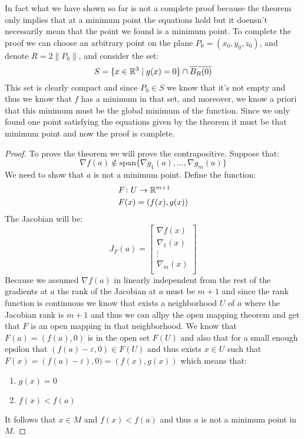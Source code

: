 \documentclass[11pt,a4paper]{article}
\begin{document}
\newpage

In fact what we have shown so far is not a complete proof because
the theorem only implies that at a minimum point the equations hold
but it doensn't necessarily mean that the point we found is a minimum
point. To complete the proof we can choose an arbitrary point on the
plane $P_0 = (x_0,y_0,z_0)$, and denote $R = 2\|P_0\|$, and consider
the set:
\[
  S = \{x \in \mathbb{R}^3 \mid g(x) = 0\} \cap \overline{B_R(0)}
\]
This set is clearly compact and since $P_0 \in S$ we know that it's not 
empty and thus we know that $f$ has a minimum in that set, and moreover,
we know a priori that this minimum must be the global minimum of the
function. Since we only found one point satisfying the equations given
by the theorem it must be that minimum point and now the proof is 
complete.

\begin{proof}
  To prove the theorem we will prove the contrapositive. Suppose that:
  \[
    \nabla f(a) \notin 
    \mathrm{span}\{\nabla g_1(a),\dots,\nabla g_m(a)\}
  \]
  We need to show that $a$ is not a minimum point. Define the function:
  \begin{align*}
    &F \colon U \to \mathbb{R}^{m+1} \\
    &F(x) = (f(x),g(x))
  \end{align*}
  The Jacobian will be:
  \[
  J_F(a) = 
    \begin{bmatrix}
      \nabla f(x)\\
      \nabla_1(x)\\
      \vdots\\
      \nabla_m(x)\\
    \end{bmatrix}
  \]
  Because we assumed $\nabla f(a)$ in linearly independent from the
  rest of the gradients at $a$ the rank of the Jacobian at $a$ must
  be $m + 1$ and since the rank function is continuous we know that
  exists a neighborhood $U$ of $a$ where the Jacobian rank is $m + 1$
  and thus we can allpy the open mapping theorem and get that $F$
  is an open mapping in that neighborhood. We know that 
  $F(a) = (f(a), 0)$ is in the open set $F(U)$ and also that for a small
  enough epsilon that $(f(a) - \varepsilon, 0) \in F(U)$ and thus
  exists $x \in U$ such that 
  $F(x) = (f(a) - \varepsilon), 0) = (f(x), g(x))$ which means that:
  \begin{enumerate}
    \item $g(x) = 0$
    \item $f(x) < f(a)$
  \end{enumerate}
  It follows that $x \in M$ and $f(x) < f(a)$ and thus $a$ is not
  a minimum point in $M$.
\end{proof}
\end{document}
